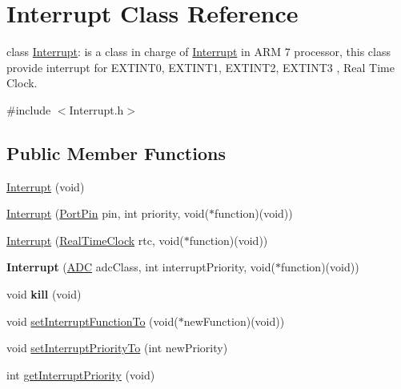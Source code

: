 \hypertarget{class_interrupt}{
\section{Interrupt Class Reference}
\label{class_interrupt}
}


class \hyperlink{class_interrupt}{Interrupt}: is a class in charge of \hyperlink{class_interrupt}{Interrupt} in ARM 7 processor, this class provide interrupt for EXTINT0, EXTINT1, EXTINT2, EXTINT3 , Real Time Clock.  




{\ttfamily \#include $<$Interrupt.h$>$}

\subsection*{Public Member Functions}
\begin{DoxyCompactItemize}
\item 
\hyperlink{class_interrupt_a2af932cad2bb12d21bcf6d3c65a7424b}{Interrupt} (void)
\item 
\hyperlink{group__group10_ga4fd8be38d92c8b0086b15b3c30ea1868}{Interrupt} (\hyperlink{class_port_pin}{PortPin} pin, int priority, void($\ast$function)(void))
\item 
\hyperlink{group__group10_gaa75f0f80c17bbc01b8fba32ab942dfbd}{Interrupt} (\hyperlink{class_real_time_clock}{RealTimeClock} rtc, void($\ast$function)(void))
\item 
\hypertarget{group__group10_ga97db0b3a65b1bf59a97d8a0b7867c69c}{
{\bfseries Interrupt} (\hyperlink{class_a_d_c}{ADC} adcClass, int interruptPriority, void($\ast$function)(void))}
\label{group__group10_ga97db0b3a65b1bf59a97d8a0b7867c69c}

\item 
\hypertarget{group__group10_ga60f69c94b5cf138e70712d17e9d5ebe4}{
void {\bfseries kill} (void)}
\label{group__group10_ga60f69c94b5cf138e70712d17e9d5ebe4}

\item 
void \hyperlink{group__group10_gac34af4078409af8f5b612477caa107df}{setInterruptFunctionTo} (void($\ast$newFunction)(void))
\item 
void \hyperlink{group__group10_ga4cd6bc79c3fa54378a156117de5f12a9}{setInterruptPriorityTo} (int newPriority)
\item 
int \hyperlink{group__group10_ga8d3124b3721e2426dc24fc8416f12e38}{getInterruptPriority} (void)
\end{DoxyCompactItemize}


